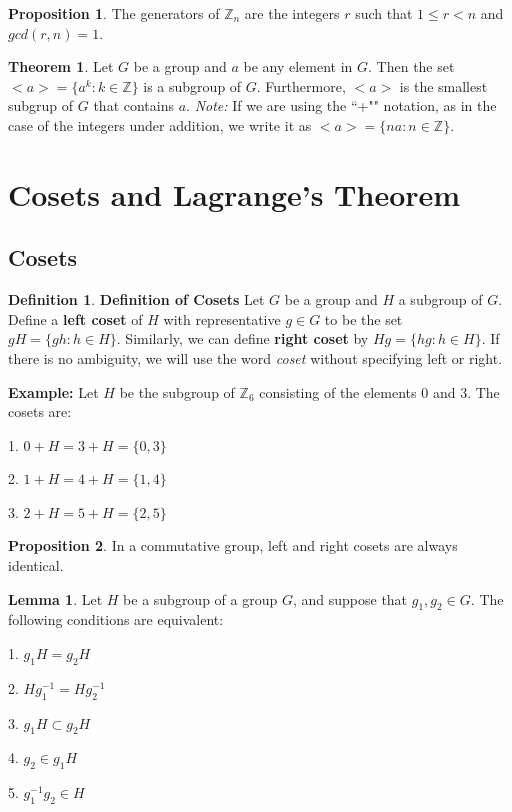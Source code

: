 \documentclass{article}
\theoremstyle{definition}
\newtheorem{defi}{Definition}[subsection]
\newtheorem{theorem}{Theorem}[subsection]
\newtheorem{prop}{Proposition}[subsection]
\newtheorem{lemma}{Lemma}[subsection]
\begin{document}
\begin{prop}
The generators of $\mathbb{Z}_n$ are the integers $r$ such that $1 \leq r <n$ and $gcd(r,n)=1$.
\end{prop}

\begin{theorem}
Let $G$ be a group and $a$ be any element in $G$. Then the set $<a>=\{a^{k}:k\in\mathbb{Z}\}$ is a subgroup of $G$. Furthermore, $<a>$ is the smallest subgrup of $G$ that contains $a$.
\textit{Note: } If we are using the ``+"" notation, as in the case of the integers under addition, we write it as $<a>=\{na: n\in\mathbb{Z}\}$.
\end{theorem}

\section{Cosets and Lagrange's Theorem}

\subsection{Cosets}
\begin{defi}
\textbf{Definition of Cosets} Let $G$ be a group and $H$ a subgroup of $G$. Define a \textbf{left coset} of $H$ with representative $g \in G$ to be the set $gH=\{gh: h \in H\}$. Similarly, we can define \textbf{right coset} by $Hg = \{hg: h\in H\}$. If there is no ambiguity, we will use the word \textit{coset} without specifying left or right.

\noindent\textbf{Example:} Let $H$ be the subgroup of $\mathbb{Z}_6$ consisting of the elements $0$ and $3$. The cosets are:
\end{defi}
1. $0+H=3+H=\{0,3\}$

2. $1+H=4+H=\{1,4\}$

3. $2+H=5+H=\{2,5\}$

\begin{prop}
In a commutative group, left and right cosets are always identical.
\end{prop}

\begin{lemma}
Let $H$ be a subgroup of a group $G$, and suppose that $g_1,g_2 \in G$. The following conditions are equivalent:

1. $g_1H=g_2H$

2. $Hg_{1}^{-1}=Hg_{2}^{-1}$

3. $g_1H \subset g_2H$

4. $g_2 \in g_1H$

5. $g_1^{-1}g_2 \in H$
\end{lemma}
\end{document}
